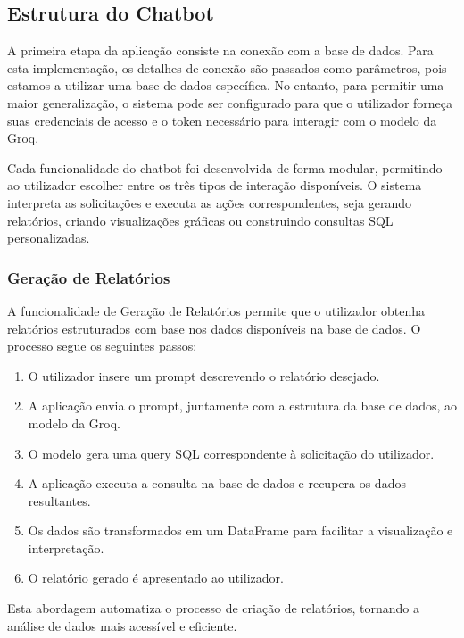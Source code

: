 \documentclass{article}
\begin{document}
\subsection{Estrutura do Chatbot}

\hspace*{1em} A primeira etapa da aplicação consiste na conexão com a base de dados. Para esta implementação, os detalhes de conexão são passados como parâmetros, pois estamos a utilizar  uma base de dados específica. No entanto, para permitir uma maior generalização, o sistema pode ser configurado para que o utilizador forneça suas credenciais de acesso e o token necessário para interagir com o modelo da Groq.

Cada funcionalidade do chatbot foi desenvolvida de forma modular, permitindo ao utilizador escolher entre os três tipos de interação disponíveis. O sistema interpreta as solicitações e executa as ações correspondentes, seja gerando relatórios, criando visualizações gráficas ou construindo consultas SQL personalizadas.


\subsubsection{Geração de Relatórios}

\hspace*{1em} A funcionalidade de Geração de Relatórios permite que o utilizador obtenha relatórios estruturados com base nos dados disponíveis na base de dados. O processo segue os seguintes passos:

\begin{enumerate}
    \item O utilizador insere um prompt descrevendo o relatório desejado.
    \item A aplicação envia o prompt, juntamente com a estrutura da base de dados, ao modelo da Groq.
    \item O modelo gera uma query SQL correspondente à solicitação do utilizador.
    \item A aplicação executa a consulta na base de dados e recupera os dados resultantes.
    \item Os dados são transformados em um DataFrame para facilitar a visualização e interpretação.
    \item O relatório gerado é apresentado ao utilizador.
\end{enumerate}

Esta abordagem automatiza o processo de criação de relatórios, tornando a análise de dados mais acessível e eficiente.
\end{document}

